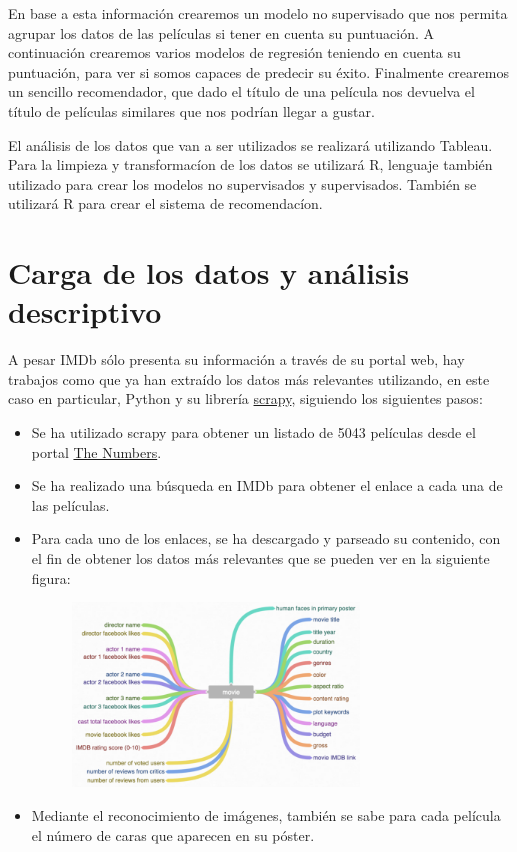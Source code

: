 \documentclass{article}
\begin{document}
En base a esta información crearemos un modelo no supervisado que nos permita agrupar los datos de las películas si tener en cuenta su puntuación. A continuación crearemos varios modelos de regresión teniendo en cuenta su puntuación, para ver si somos capaces de predecir su éxito. Finalmente crearemos un sencillo recomendador, que dado el título de una película nos devuelva el título de películas similares que nos podrían llegar a gustar.

El análisis de los datos que van a ser utilizados se realizará utilizando Tableau. Para la limpieza y transformacíon de los datos se utilizará R, lenguaje también utilizado para crear los modelos no supervisados y supervisados. También se utilizará R para crear el sistema de recomendacíon.  

\clearpage

\section{Carga de los datos y análisis descriptivo}

A pesar IMDb sólo presenta su información a través de su portal web, hay trabajos como \cite{imdb5000} que ya han extraído los datos más relevantes utilizando, en este caso en particular, Python y su librería \href{https://scrapy.org/}{scrapy}, siguiendo los siguientes pasos:

\begin{itemize}
  \item Se ha utilizado scrapy para obtener un listado de 5043 películas desde el portal \href{http://www.the-numbers.com/movie/budgets/all}{The Numbers}.
  \item Se ha realizado una búsqueda en IMDb para obtener el enlace a cada una de las películas.
  \item Para cada uno de los enlaces, se ha descargado y parseado su contenido, con el fin de obtener los datos más relevantes que se pueden ver en la siguiente figura:

    \begin{figure}[h]
    \centering
    \includegraphics[width=3in,clip,keepaspectratio]{./images_latex/imdb_attributes.png}
    \label{fig:imdb_attributes}
    \end{figure}

  \item Mediante el reconocimiento de imágenes, también se sabe para cada película el número de caras que aparecen en su póster.
\end{itemize}
\end{document}
